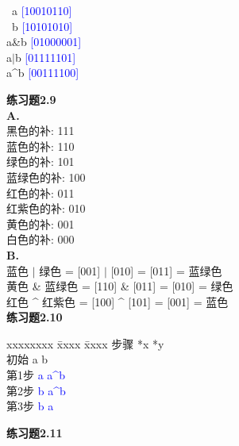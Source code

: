 \documentclass{article}
\begin{document}
\begin{CJK}{UTF8}{uyhei}
\begin{tabbing}
	~a		\>	\textcolor{blue}{[10010110]}	\\
	~b		\>	\textcolor{blue}{[10101010]}	\\
	a\&b		\>	\textcolor{blue}{[01000001]}	\\
	a$|$b		\>	\textcolor{blue}{[01111101]}	\\
	a\^{}b		\>	\textcolor{blue}{[00111100]}	\\
\end{tabbing}
\textbf{练习题2.9} \\
\textbf{A.}\\
\hspace*{1em} 黑色的补:		111	\\
\hspace*{1em} 蓝色的补:		110	\\
\hspace*{1em} 绿色的补:		101	\\
\hspace*{1em} 蓝绿色的补:	100	\\
\hspace*{1em} 红色的补:		011	\\
\hspace*{1em} 红紫色的补:	010	\\
\hspace*{1em} 黄色的补:		001	\\
\hspace*{1em} 白色的补:		000	\\
\textbf{B.}\\
\hspace*{1em}		蓝色 $|$ 绿色 = [001] $|$ [010] = [011] = 蓝绿色	\\
\hspace*{1em}		黄色 \& 蓝绿色 = [110] \& [011] = [010] = 绿色		\\
\hspace*{1em}		红色 \^{} 红紫色 = [100] \^{} [101] = [001] = 蓝色 \\[3ex]
\textbf{练习题2.10}
\begin{tabbing}
	xxxxxxxx	\=	xxxx	\=	xxxx	\kill
	步骤		\>	*x	\>	*y	\\
	初始		\>	a	\>	b	\\
	第1步		\>	\textcolor{blue}{a}	\>	\textcolor{blue}{a\^{}b}	\\
	第2步		\>	\textcolor{blue}{b}	\>	\textcolor{blue}{a\^{}b}	\\
	第3步		\>	\textcolor{blue}{b}	\>	\textcolor{blue}{a}	\\
\end{tabbing}
\textbf{练习题2.11}	\\

\end{CJK}
\end{document}

